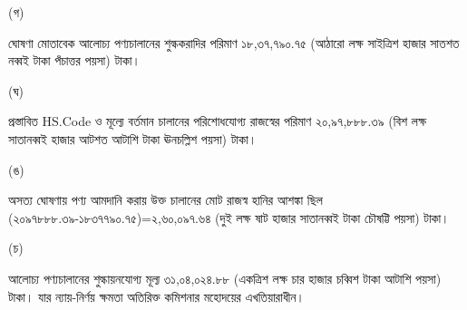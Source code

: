 \documentclass[12pt]{article}
\begin{document}
\begin{minipage}[t]{0.05\linewidth}
\hspace{0em}
\end{minipage}
\begin{minipage}[t]{0.05\linewidth}
(গ)
\end{minipage}
\begin{minipage}[t]{0.90\linewidth}
ঘোষণা মোতাবেক আলোচ্য পণ্যচালানের শুল্ককরাদির পরিমাণ ১৮,৩৭,৭৯০.৭৫ (আঠারো লক্ষ সাইত্রিশ হাজার সাতশত নব্বই টাকা পঁচাত্তর পয়সা) টাকা।
\\
\end{minipage}
\begin{minipage}[t]{0.05\linewidth}
\hspace{0em}
\end{minipage}
\begin{minipage}[t]{0.05\linewidth}
(ঘ)
\end{minipage}
\begin{minipage}[t]{0.90\linewidth}
প্রস্তাবিত HS.Code ও মূল্যে বর্তমান চালানের পরিশোধযোগ্য রাজস্বের পরিমাণ
২০,৯৭,৮৮৮.৩৯ (বিশ লক্ষ সাতানব্বই হাজার আটশত আটাশি টাকা ঊনচল্লিশ পয়সা) টাকা।
\\
\end{minipage}
\begin{minipage}[t]{0.05\linewidth}
\hspace{0em}
\end{minipage}
\begin{minipage}[t]{0.05\linewidth}
(ঙ)
\end{minipage}
\begin{minipage}[t]{0.90\linewidth}
অসত্য ঘোষণায় পণ্য আমদানি করায় উক্ত চালানের মোট রাজস্ব হানির আশঙ্কা ছিল (২০৯৭৮৮৮.৩৯-১৮৩৭৭৯০.৭৫)=২,৬০,০৯৭.৬৪
(দুই লক্ষ ষাট হাজার সাতানব্বই টাকা চৌষট্টি পয়সা) টাকা।
\\
\end{minipage}
\begin{minipage}[t]{0.05\linewidth}
\hspace{0em}
\end{minipage}
\begin{minipage}[t]{0.05\linewidth}
(চ)
\end{minipage}
\begin{minipage}[t]{0.90\linewidth}
আলোচ্য পণ্যচালানের শুল্কায়নযোগ্য
মূল্য ৩১,০৪,০২৪.৮৮ (একত্রিশ লক্ষ চার হাজার চব্বিশ টাকা আটাশি পয়সা) টাকা। যার ন্যায়-নির্ণয় ক্ষমতা অতিরিক্ত কমিশনার মহোদয়ের এখতিয়ারাধীন।
\\
\end{minipage}
\thispagestyle{laststyle}
\end{document}
